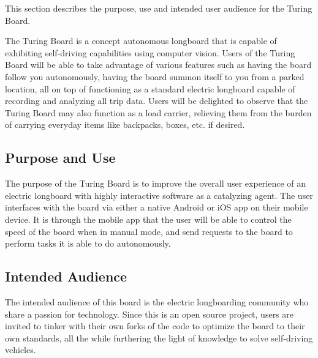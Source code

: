 This section describes the purpose, use and intended user audience for the Turing Board. 

The Turing Board is a concept autonomous longboard that is capable of exhibiting self-driving capabilities using computer vision. Users of the Turing Board will be able to take advantage of various features such as having the board follow you autonomously, having the board summon itself to you from a parked location, all on top of functioning as a standard electric longboard capable of recording and analyzing all trip data. Users will be delighted to observe that the Turing Board may also function as a load carrier, relieving them from the burden of carrying everyday items like backpacks, boxes, etc. if desired. 

\subsection{Purpose and Use}
The purpose of the Turing Board is to improve the overall user experience of an electric longboard with highly interactive software as a catalyzing agent. The user interfaces with the board via either a native Android or iOS app on their mobile device. It is through the mobile app that the user will be able to control the speed of the board when in manual mode, and send requests to the board to perform tasks it is able to do autonomously. 

\subsection{Intended Audience}
The intended audience of this board is the electric longboarding community who share a passion for technology. Since this is an open source project, users are invited to tinker with their own forks of the code to optimize the board to their own standards, all the while furthering the light of knowledge to solve self-driving vehicles. 
